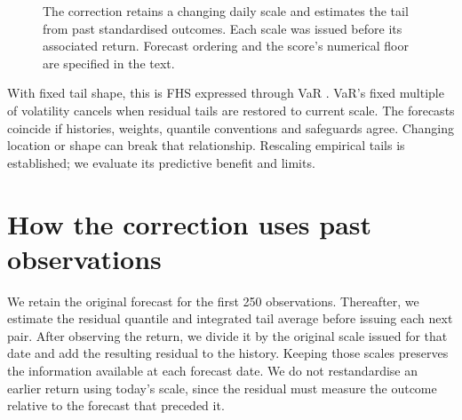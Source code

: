 \begin{figure}[!htbp]
\centering
{}
\caption[How residual tail correction works]{The correction retains a changing daily scale and estimates the tail from past standardised outcomes. Each scale was issued before its associated return. Forecast ordering and the score's numerical floor are specified in the text.}
\label{fig:tail-correction-workflow}
\end{figure}

With fixed tail shape, this is FHS expressed through VaR \citep{baroneadesi1999var,baroneadesi2008garch}. VaR's fixed multiple of volatility cancels when residual tails are restored to current scale. The forecasts coincide if histories, weights, quantile conventions and safeguards agree. Changing location or shape can break that relationship. Rescaling empirical tails is established; we evaluate its predictive benefit and limits.

\section{How the correction uses past observations}

We retain the original forecast for the first 250 observations. Thereafter, we estimate the residual quantile and integrated tail average before issuing each next pair. After observing the return, we divide it by the original scale issued for that date and add the resulting residual to the history. Keeping those scales preserves the information available at each forecast date. We do not restandardise an earlier return using today's scale, since the residual must measure the outcome relative to the forecast that preceded it.

